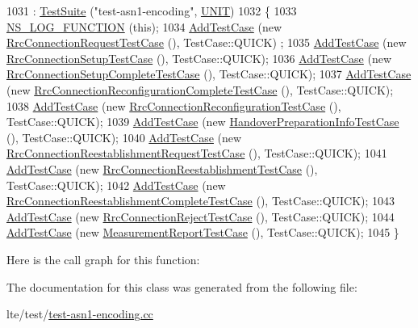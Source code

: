 \begin{DoxyCode}
1031   : \hyperlink{classns3_1_1TestSuite_a904b0c40583b744d30908aeb94636d1a}{TestSuite} (\textcolor{stringliteral}{"test-asn1-encoding"}, \hyperlink{classns3_1_1TestSuite_a1ebfcab34ec8161e085e8e3a1855eae0a3885375a3787abf60431f8454b3cadbd}{UNIT})
1032 \{
1033   \hyperlink{log-macros-disabled_8h_a90b90d5bad1f39cb1b64923ea94c0761}{NS\_LOG\_FUNCTION} (\textcolor{keyword}{this});
1034   \hyperlink{classns3_1_1TestCase_a3718088e3eefd5d6454569d2e0ddd835}{AddTestCase} (\textcolor{keyword}{new} \hyperlink{classRrcConnectionRequestTestCase}{RrcConnectionRequestTestCase} (), TestCase::QUICK)
      ;
1035   \hyperlink{classns3_1_1TestCase_a3718088e3eefd5d6454569d2e0ddd835}{AddTestCase} (\textcolor{keyword}{new} \hyperlink{classRrcConnectionSetupTestCase}{RrcConnectionSetupTestCase} (), TestCase::QUICK);
1036   \hyperlink{classns3_1_1TestCase_a3718088e3eefd5d6454569d2e0ddd835}{AddTestCase} (\textcolor{keyword}{new} \hyperlink{classRrcConnectionSetupCompleteTestCase}{RrcConnectionSetupCompleteTestCase} (), 
      TestCase::QUICK);
1037   \hyperlink{classns3_1_1TestCase_a3718088e3eefd5d6454569d2e0ddd835}{AddTestCase} (\textcolor{keyword}{new} \hyperlink{classRrcConnectionReconfigurationCompleteTestCase}{RrcConnectionReconfigurationCompleteTestCase}
       (), TestCase::QUICK);
1038   \hyperlink{classns3_1_1TestCase_a3718088e3eefd5d6454569d2e0ddd835}{AddTestCase} (\textcolor{keyword}{new} \hyperlink{classRrcConnectionReconfigurationTestCase}{RrcConnectionReconfigurationTestCase} (), 
      TestCase::QUICK);
1039   \hyperlink{classns3_1_1TestCase_a3718088e3eefd5d6454569d2e0ddd835}{AddTestCase} (\textcolor{keyword}{new} \hyperlink{classHandoverPreparationInfoTestCase}{HandoverPreparationInfoTestCase} (), 
      TestCase::QUICK);
1040   \hyperlink{classns3_1_1TestCase_a3718088e3eefd5d6454569d2e0ddd835}{AddTestCase} (\textcolor{keyword}{new} \hyperlink{classRrcConnectionReestablishmentRequestTestCase}{RrcConnectionReestablishmentRequestTestCase}
       (), TestCase::QUICK);
1041   \hyperlink{classns3_1_1TestCase_a3718088e3eefd5d6454569d2e0ddd835}{AddTestCase} (\textcolor{keyword}{new} \hyperlink{classRrcConnectionReestablishmentTestCase}{RrcConnectionReestablishmentTestCase} (), 
      TestCase::QUICK);
1042   \hyperlink{classns3_1_1TestCase_a3718088e3eefd5d6454569d2e0ddd835}{AddTestCase} (\textcolor{keyword}{new} \hyperlink{classRrcConnectionReestablishmentCompleteTestCase}{RrcConnectionReestablishmentCompleteTestCase}
       (), TestCase::QUICK);
1043   \hyperlink{classns3_1_1TestCase_a3718088e3eefd5d6454569d2e0ddd835}{AddTestCase} (\textcolor{keyword}{new} \hyperlink{classRrcConnectionRejectTestCase}{RrcConnectionRejectTestCase} (), TestCase::QUICK);
1044   \hyperlink{classns3_1_1TestCase_a3718088e3eefd5d6454569d2e0ddd835}{AddTestCase} (\textcolor{keyword}{new} \hyperlink{classMeasurementReportTestCase}{MeasurementReportTestCase} (), TestCase::QUICK);
1045 \}
\end{DoxyCode}


Here is the call graph for this function\+:




The documentation for this class was generated from the following file\+:\begin{DoxyCompactItemize}
\item 
lte/test/\hyperlink{test-asn1-encoding_8cc}{test-\/asn1-\/encoding.\+cc}\end{DoxyCompactItemize}
